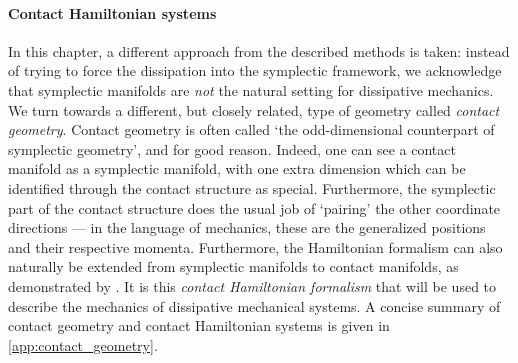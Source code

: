 \paragraph{Contact Hamiltonian systems} In this chapter, a different approach from the described methods is taken: instead of trying to force the dissipation into the symplectic framework, we acknowledge that symplectic manifolds are \emph{not} the natural setting for dissipative mechanics. We turn towards a different, but closely related, type of geometry called \emph{contact geometry}. Contact geometry is often called `the odd-dimensional counterpart of symplectic geometry', and for good reason. Indeed, one can see a contact manifold as a symplectic manifold, with one extra dimension which can be identified through the contact structure as special. Furthermore, the symplectic part of the contact structure does the usual job of `pairing' the other coordinate directions --- in the language of mechanics, these are the generalized positions and their respective momenta. Furthermore, the Hamiltonian formalism can also naturally be extended from symplectic manifolds to contact manifolds, as demonstrated by \citet{Arnold1989}. It is this \emph{contact Hamiltonian formalism} that will be used to describe the mechanics of dissipative mechanical systems. A concise summary of contact geometry and contact Hamiltonian systems is given in \cref{app:contact_geometry}.


